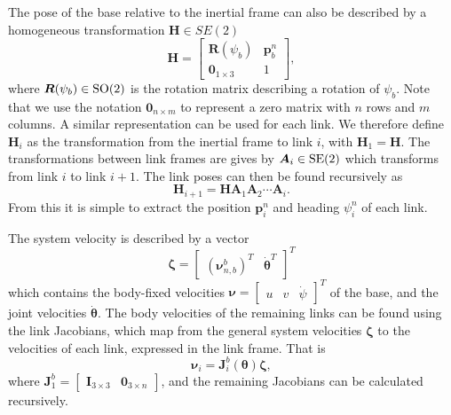 \documentclass[../main.tex]{subfiles}
\begin{document}
The pose of the base relative to the inertial frame can also be described by a homogeneous transformation $\bm{H} \in SE(2)$
\begin{equation}
    \bm{H} = \begin{bmatrix}
        \bm{R}(\psi_b) & \bm{p}_{b}^n \\
        \bm{0}_{1 \times 3} & 1
    \end{bmatrix},
\end{equation}
where $\bm{R}(\psi_b) \in \operatorname{SO}(2)$ is the rotation matrix describing a rotation of $\psi_b$. Note that we use the notation $\bm{0}_{n \times m}$ to represent a zero matrix with $n$ rows and $m$ columns. A similar representation can be used for each link. We therefore define $\bm{H}_i$ as the transformation from the inertial frame to link $i$, with $\bm{H}_1 = \bm{H}$. The transformations between link frames are gives by $\bm{A}_i \in \operatorname{SE}(2)$ which transforms from link $i$ to link $i+1$. The link poses can then be found recursively as
\begin{equation}
    \bm{H}_{i+1} = \bm{H} \bm{A}_1 \bm{A}_2 \cdots \bm{A}_i.
\end{equation}
From this it is simple to extract the position $\bm{p}_{i}^n$ and heading $\psi_{i}^n$ of each link.

The system velocity is described by a vector
\begin{equation}
    \label{eq:zeta}
    \bm{\zeta} = \begin{bmatrix} (\bm{\nu}^b_{n,b})^T & \dot{\bm{\theta}}^T \end{bmatrix}^T
\end{equation}
which contains the body-fixed velocities $\bm{\nu} = \begin{bmatrix} u & v &\dot{\psi} \end{bmatrix}^T$ of the base, and the joint velocities $\dot{\bm{\theta}}$. The body velocities of the remaining links can be found using the link Jacobians, which map from the general system velocities $\bm{\zeta}$ to the velocities of each link, expressed in the link frame. That is
\begin{equation}
    \label{eq:link_jacobian}
    \bm{\nu}_i = \bm{J}_i^b(\bm{\theta}) \bm{\zeta},
\end{equation}
where $\bm{J}_1^b = \begin{bmatrix}
        \bm{I}_{3 \times 3} & \bm{0}_{3 \times n}
    \end{bmatrix}$,
and the remaining Jacobians can be calculated recursively.
\end{document}

